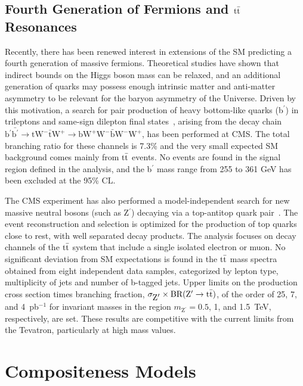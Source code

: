 \documentclass[11pt]{article}
\def\GeVmass {GeV\xspace}
\def\Zprime{Z$^\prime$\xspace}
\def\bprime{b$^\prime$\xspace}
\def\ttbar{\ensuremath{\rm{t} \bar{\rm{t}}}\xspace}
\def\pb{pb$^{-1}$\xspace}
\begin{document}
\subsection{Fourth Generation of Fermions and \ttbar Resonances}

Recently, there has been renewed interest in extensions of the SM 
predicting a fourth generation of massive fermions. 
Theoretical studies have shown that indirect bounds on the Higgs boson mass 
can be relaxed, and an additional generation of quarks may possess 
enough intrinsic matter and anti-matter asymmetry to be relevant for 
the baryon asymmetry of the Universe. Driven by this motivation, a search 
for pair production of heavy bottom-like quarks (\bprime) in trileptons 
and same-sign dilepton final states~\cite{Chatrchyan:2011em}, arising from the decay 
chain $\mbox{\bprime}\bar{\mbox{\bprime}} \rightarrow \mbox{tW}^{-}\bar{\mbox{t}}\mbox{W}^{+} \rightarrow \mbox{bW}^{+}\mbox{W}^{-}\bar{\mbox{b}}\mbox{W}^{-}\mbox{W}^+$, has been performed at CMS.
The total branching ratio for these channels is 7.3\% and the very small 
expected SM background comes mainly from \ttbar events. No events are found in
the signal region defined in the analysis, and the \bprime mass range from 
255 to 361 \GeVmass has been excluded at the 95\% CL.

The CMS experiment has also performed a model-independent search for 
new massive neutral bosons (such as \Zprime) decaying via a top-antitop 
quark pair~\cite{CMSPAS:TOP-10-007}. 
The event reconstruction and selection is optimized for the 
production of top quarks close to rest, with well separated decay products. 
The analysis focuses on decay channels of the \ttbar system that include a 
single isolated electron or muon. No significant deviation from SM expectations 
is found in the \ttbar mass spectra obtained from eight independent data samples, 
categorized by lepton type, multiplicity of jets and number of b-tagged jets. 
Upper limits on the production cross section times branching fraction, 
$\sigma_{\mbox{\Zprime}} \times \mbox{BR}(\mbox{\Zprime}\rightarrow\mbox{\ttbar})$, 
of the order of 25, 7, and 4~\pb for invariant masses in the 
region $m_{\mbox{\Zprime}}=0.5$, 1, and 1.5~TeV, respectively, are set. 
These results are competitive with the current limits from the Tevatron, 
particularly at high mass values.

\section{Compositeness Models}\label{sec:compositeness}
\end{document}
